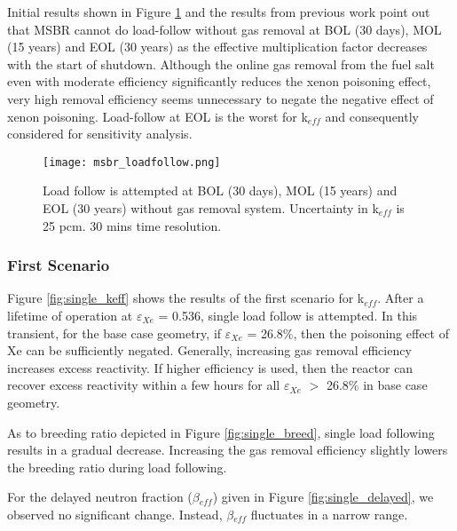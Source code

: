     Initial results shown in Figure \ref{fig:loadfollow} and the results from
    previous work \cite{rykhlevskii_fuel_2020} point out that MSBR cannot do
    load-follow without gas removal at BOL (30 days), MOL (15 years) and EOL (30
    years) as the effective multiplication factor decreases with the start of
    shutdown. Although the online gas removal from the fuel salt even with moderate efficiency significantly reduces the xenon poisoning effect, very high removal efficiency seems unnecessary to negate the negative effect of xenon poisoning. Load-follow at EOL is the worst for k$_{eff}$ and consequently considered for sensitivity analysis.

    \begin{figure}[h]
        \begin{center}
            \texttt{[image: msbr\_loadfollow.png]}
        \end{center}
        \caption{Load follow is attempted at BOL (30 days), MOL (15 years) and EOL (30 years) without gas removal system. Uncertainty in k$_{eff}$ is 25 pcm. 30 mins time resolution.}
        \label{fig:loadfollow}
    \end{figure}

\subsubsection{First Scenario}

    Figure \ref{fig:single_keff} shows the results of the first scenario for
    k$_{eff}$. After a lifetime of operation at $\varepsilon$$_{Xe}$ = 0.536,
    single load follow is attempted. In this transient, for the base case
    geometry, if $\varepsilon$$_{Xe}$ = 26.8\%, then the poisoning effect of Xe
    can be sufficiently negated. Generally, increasing gas removal efficiency
    increases excess reactivity. If higher efficiency is used, then the reactor
    can recover excess reactivity within a few hours for all
    $\varepsilon$$_{Xe}$ $>$ 26.8\% in base case geometry.

    As to breeding ratio depicted in Figure \ref{fig:single_breed}, single load
    following results in a gradual decrease. Increasing the gas removal
    efficiency slightly lowers the breeding ratio during load following.

    For the delayed neutron fraction ($\beta$$_{eff}$) given in Figure
    \ref{fig:single_delayed}, we observed no significant change. Instead,
    $\beta$$_{eff}$ fluctuates in a narrow range.

